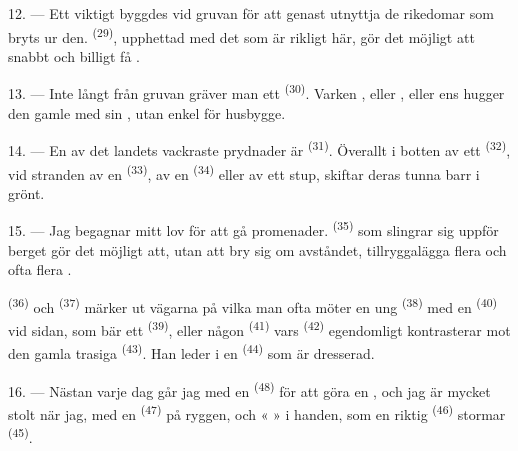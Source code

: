 12. --- Ett viktigt  byggdes vid gruvan för att genast utnyttja de rikedomar
som bryts ur den.  \textsuperscript{(29)}, upphettad med det 
som är rikligt här, gör det möjligt att snabbt och billigt få .

13. --- Inte långt från gruvan gräver man ett  \textsuperscript{(30)}.
Varken , eller , eller ens
 hugger den gamle  med sin ,
utan enkel  för husbygge.

14. --- En av det landets vackraste prydnader är  \textsuperscript{(31)}.
Överallt i botten av ett  \textsuperscript{(32)}, vid stranden av en
 \textsuperscript{(33)}, av en  \textsuperscript{(34)} eller av
ett stup, skiftar deras tunna barr i grönt.

\VUsaut{3.0mm}
\VUsaut{3.0mm}

15. --- Jag begagnar mitt lov för att gå  promenader.
 \textsuperscript{(35)} som slingrar sig uppför berget gör det
möjligt att, utan att bry sig om avståndet, tillryggalägga flera
 och ofta flera .

 \textsuperscript{(36)} och 
\textsuperscript{(37)} märker ut vägarna på vilka man ofta möter en ung
 \textsuperscript{(38)} med en 
\textsuperscript{(40)} vid sidan, som bär ett  \textsuperscript{(39)},
eller någon  \textsuperscript{(41)} vars 
\textsuperscript{(42)} egendomligt kontrasterar mot den gamla trasiga 
\textsuperscript{(43)}. Han leder i en
 \textsuperscript{(44)} som är dresserad.

\VUsaut{3.0mm}

16. --- Nästan varje dag går jag med en  \textsuperscript{(48)} för att göra en
, och jag är mycket stolt när jag, med en
 \textsuperscript{(47)} på ryggen, och «  » i
handen, som en riktig  \textsuperscript{(46)} stormar
 \textsuperscript{(45)}.

